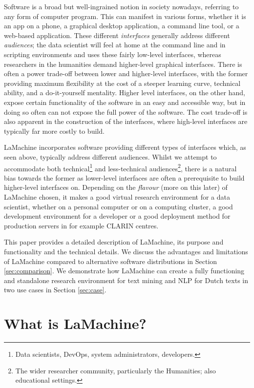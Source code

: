 \documentclass[a4paper,11pt]{article}
\begin{document}
Software is a broad but well-ingrained notion in society nowadays, referring to any form of computer program. This can
manifest in various forms, whether it is an app on a phone, a graphical desktop application, a command line tool, or a
web-based application. These different \emph{interfaces} generally address different \emph{audiences}; the data
scientist will feel at home at the command line and in scripting environments and uses these fairly low-level
interfaces, whereas researchers in the humanities demand higher-level graphical interfaces. There is often a power trade-off
between lower and higher-level interfaces, with the former providing maximum flexibility at the cost of a steeper
learning curve, technical ability, and a do-it-yourself mentality. Higher level interfaces, on the other
hand, expose certain functionality of the software in an easy and accessible way, but in doing so often can not expose
the full power of the software. The cost trade-off is also apparent in the construction of the interfaces, where
high-level interfaces are typically far more costly to build.

LaMachine incorporates software providing different types of interfaces which, as seen above, typically address different audiences. Whilst we
attempt to accommodate both technical\footnote{Data scientists, DevOps, system administrators, developers.} and
less-technical audiences\footnote{The wider researcher community, particularly the Humanities; also educational
settings.}, there is a natural bias towards the former as lower-level interfaces are often a prerequisite to build
higher-level interfaces on. Depending on the \emph{flavour} (more on this later) of LaMachine chosen, it makes a good virtual research
environment for a data scientist, whether on a personal computer or on a computing cluster, a good development
environment for a developer or a good deployment method for production servers in for example CLARIN centres.

This paper provides a detailed description of LaMachine, its purpose and functionality and the technical details. We
discuss the advantages and limitations of LaMachine compared to alternative software distributions in Section \ref{sec:comparison}. We demonstrate how LaMachine can create a fully functioning and standalone research environment for text mining  and NLP for Dutch texts in two use cases in Section \ref{sec:case}.

\section{What is LaMachine?}
\end{document}
